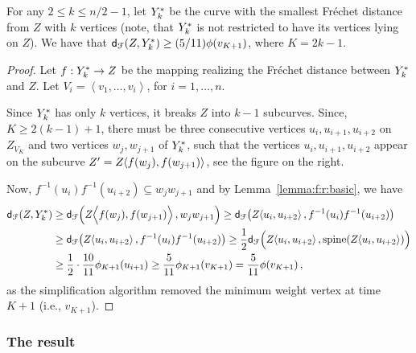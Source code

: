 \documentclass[12pt]{article}
\newcommand{\lemlab}[1]{\label{lemma:#1}}
\newcommand{\lemref}[1]{Lemma~\ref{lemma:#1}}
\newcommand{\ts}{\hspace{0.6pt}}
\newcommand{\Frechet}{Fr\'{e}c{h}e{}t\xspace}\providecommand{\Arr}{\mathop{\mathrm{\EuScript{A}}}}
\newcommand{\distFr}[2]{\mathsf{d}_{\EuScript{F}}\pth{#1, #2}}
\newcommand{\SimplifyX}[1]{#1}
\newcommand{\cZ}{{Z}}
\newcommand{\cY}{\SimplifyX{\cYBase}}
\providecommand{\pth}[2][\!]{#1\left({#2}\right)}
\providecommand{\MakeBig}{\rule[-.2cm]{0cm}{0.4cm}}
\providecommand{\MakeBig}{\rule[-.2cm]{0cm}{0.4cm}}
\providecommand{\MakeSBig}{\rule[0.0cm]{0.0cm}{0.35cm}}
\newcommand{\SC}[3]{{#1}\!\!\ts\ts \left\langle  #2, #3 \right\rangle}
\newcommand{\SpCrv}[2]{{#1}_{#2}}
\newcommand{\VtxSet}{{V}}
\newcommand{\spineX}[1]{\mathrm{s{}p{}i{}n{}e}\pth{#1}}
\newcommand{\permut}[1]{\left\langle {#1} \right\rangle}
\newcommand{\vtxA}{u}
\newcommand{\vtxB}{v}
\newcommand{\vtxC}{w}
\newcommand{\weightIdx}[2]{\ensuremath{\phi_{#1}\pth{#2}}}
\newcommand{\weight}[1]{\ensuremath{\phi\pth{\vtx_{#1}}}}
\newcommand{\vtx}{\vtxB}
\newcommand{\segX}[2]{{#1}{#2}}
\newcommand{\SNumVertices}[1]{2#1 - 1}
\newcommand{\cYk}{\cY_k^*}
\numberwithin{figure}{section}
\numberwithin{equation}{section}
\begin{document}
\begin{lemma}\lemlab{universal:ii}For any $2 \leq k \leq n/2-1$, let $\cYk$ be the curve with the
    smallest \Frechet distance from $\cZ$ with $k$ vertices (note,
    that $\cYk$ is not restricted to have its vertices lying on
    $\cZ$). We have that $\distFr{\cZ}{\cYk} \geq (5/11) \weight{K+1}
    $, where $K = \SNumVertices{k}$.
\end{lemma}
\begin{proof}
    Let $f:\cYk \rightarrow Z$ be the mapping realizing the \Frechet
    distance between $\cY_k^*$ and $\cZ$. Let $V_i = \permut{ \vtx_1,
       \ldots, \vtx_i}$, for $i=1, \ldots, n$.
    
    
    Since $\cYk$ has only $k$ vertices, it breaks $\cZ$ into $k-1$
    subcurves. Since, $K \geq 2(k-1) + 1$, there must be three
    consecutive vertices $\vtxA_i, \vtxA_{i+1}, \vtxA_{i+2}$ on
    $\SpCrv{\cZ}{\VtxSet_{K}}$ and two vertices $\vtxC_j,\vtxC_{j+1}$
    of $\cYk$, such that the vertices $\vtxA_i, \vtxA_{i+1},
    \vtxA_{i+2}$ appear on the subcurve $\cZ' =
    \SC{\cZ}{f(\vtxC_j)}{f(\vtxC_{j+1})}$, see the figure on the
    right.
    
    Now, $\segX{f^{-1}(\vtxA_i)}{f^{-1}(\vtxA_{i+2})} \subseteq
    \vtxC_j\vtxC_{j+1}$ and by \lemref{f:r:basic}, we have
    \begin{align*}
        \distFr{\cZ}{\cYk}&\geq \distFr{ \MakeBig \SC{\cZ}{\MakeSBig
              f(\vtxC_j)}{f(\vtxC_{j+1})} }{\vtxC_j \vtxC_{j+1}}\geq \distFr{\SC{\cZ}{\vtxA_i}{\vtxA_{i+2}}} {f^{-1}(\vtxA_i)
           f^{-1}(\vtxA_{i+2})}\\ &\geq \distFr{\SC{\cZ}{\vtxA_i}{\vtxA_{i+2}}} {f^{-1}(\vtxA_i)
           f^{-1}(\vtxA_{i+2})}\geq \frac{1}{2}\distFr{\MakeBig\SC{\cZ}{\vtxA_i}{\vtxA_{i+2}}}{\spineX{\SC{\cZ}{\vtxA_i}{\vtxA_{i+2}}}}\\ &\geq \frac{1}{2} \cdot \frac{10}{11} \weightIdx{K+1}{ \vtxA_{i+1}}\geq \frac{5}{11} \weightIdx{K+1}{\vtx_{K+1}}= \frac{5}{11} \weight{K+1},
    \end{align*}
    as the simplification algorithm removed the minimum weight vertex
    at time $K+1$ (i.e., $\vtx_{K+1}$).
\end{proof}

\subsubsection{The result}
\end{document}
